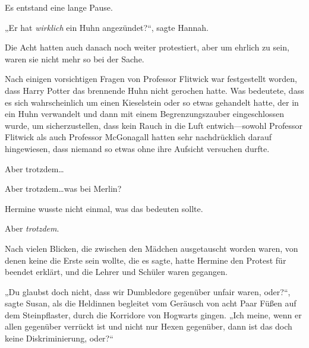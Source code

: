 Es entstand eine lange Pause.

„Er hat \emph{wirklich} ein Huhn angezündet?“, sagte Hannah.

\later

Die Acht hatten auch danach noch weiter protestiert, aber um ehrlich zu sein, waren sie nicht mehr so bei der Sache.

Nach einigen vorsichtigen Fragen von Professor Flitwick war festgestellt worden, dass Harry Potter das brennende Huhn nicht gerochen hatte. Was bedeutete, dass es sich wahrscheinlich um einen Kieselstein oder so etwas gehandelt hatte, der in ein Huhn verwandelt und dann mit einem Begrenzungszauber eingeschlossen wurde, um sicherzustellen, dass kein Rauch in die Luft entwich—sowohl Professor Flitwick als auch Professor McGonagall hatten sehr nachdrücklich darauf hingewiesen, dass niemand so etwas ohne ihre Aufsicht versuchen durfte.

Aber trotzdem…

Aber trotzdem…was bei Merlin?

Hermine wusste nicht einmal, was das bedeuten sollte.

Aber \emph{trotzdem}.

Nach vielen Blicken, die zwischen den Mädchen ausgetauscht worden waren, von denen keine die Erste sein wollte, die es sagte, hatte Hermine den Protest für beendet erklärt, und die Lehrer und Schüler waren gegangen.

„Du glaubst doch nicht, dass wir Dumbledore gegenüber unfair waren, oder?“, sagte Susan, als die Heldinnen begleitet vom Geräusch von acht Paar Füßen auf dem Steinpflaster, durch die Korridore von Hogwarts gingen.
„Ich meine, wenn er allen gegenüber verrückt ist und nicht nur Hexen gegenüber, dann ist das doch keine Diskriminierung, oder?“

